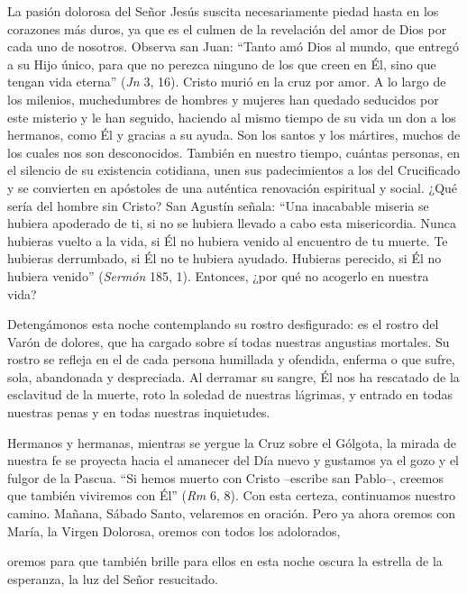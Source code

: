 			\begin{body}La pasión dolorosa del Señor Jesús suscita necesariamente piedad hasta en los corazones más duros, ya que es el culmen de la revelación del amor de Dios por cada uno de nosotros. Observa san Juan: “Tanto amó Dios al mundo, que entregó a su Hijo único, para que no perezca ninguno de los que creen en Él, sino que tengan vida eterna” (\textit{Jn} 3, 16). Cristo murió en la cruz por amor. A lo largo de los milenios, muchedumbres de hombres y mujeres han quedado seducidos por este misterio y le han seguido, haciendo al mismo tiempo de su vida un don a los hermanos, como Él y gracias a su ayuda. Son los santos y los mártires, muchos de los cuales nos son desconocidos. También en nuestro tiempo, cuántas personas, en el silencio de su existencia cotidiana, unen sus padecimientos a los del Crucificado y se convierten en apóstoles de una auténtica renovación espiritual y social. ¿Qué sería del hombre sin Cristo? San Agustín señala: “Una inacabable miseria se hubiera apoderado de ti, si no se hubiera llevado a cabo esta misericordia. Nunca hubieras vuelto a la vida, si Él no hubiera venido al encuentro de tu muerte. Te hubieras derrumbado, si Él no te hubiera ayudado. Hubieras perecido, si Él no hubiera venido” (\textit{Sermón} 185, 1). Entonces, ¿por qué no acogerlo en nuestra vida?\end{body}
			
			\begin{body}Detengámonos esta noche contemplando su rostro desfigurado: es el rostro del Varón de dolores, que ha cargado sobre sí todas nuestras angustias mortales. Su rostro se refleja en el de cada persona humillada y ofendida, enferma o que sufre, sola, abandonada y despreciada. Al derramar su sangre, Él nos ha rescatado de la esclavitud de la muerte, roto la soledad de nuestras lágrimas, y entrado en todas nuestras penas y en todas nuestras inquietudes.\end{body}
			
			\begin{body}Hermanos y hermanas, mientras se yergue la Cruz sobre el Gólgota, la mirada de nuestra fe se proyecta hacia el amanecer del Día nuevo y gustamos ya el gozo y el fulgor de la Pascua. “Si hemos muerto con Cristo –escribe san Pablo–, creemos que también viviremos con Él” (\textit{Rm} 6, 8). Con esta certeza, continuamos nuestro camino. Mañana, Sábado Santo, velaremos en oración. Pero ya ahora oremos con María, la Virgen Dolorosa, oremos con todos los adolorados, \begin{bodysmall}\end{bodysmall} oremos para que también brille para ellos en esta noche oscura la estrella de la esperanza, la luz del Señor resucitado.\end{body}
			
